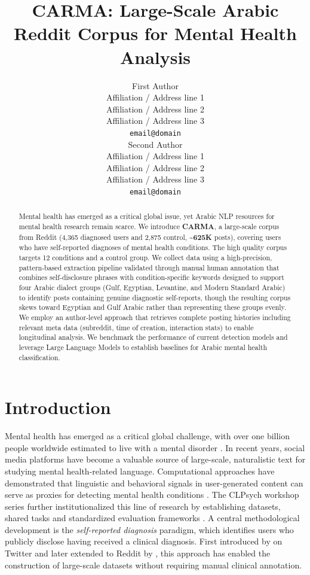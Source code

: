 \documentclass[11pt]{article}
\title{CARMA: Large-Scale Arabic Reddit Corpus for Mental Health Analysis}
\author{First Author \\
  Affiliation / Address line 1 \\
  Affiliation / Address line 2 \\
  Affiliation / Address line 3 \\
  \texttt{email@domain} \\\And
  Second Author \\
  Affiliation / Address line 1 \\
  Affiliation / Address line 2 \\
  Affiliation / Address line 3 \\
  \texttt{email@domain} \\}
\begin{document}
\maketitle
\begin{abstract}
Mental health has emerged as a critical global issue, yet Arabic NLP resources for mental health research remain scarce. We introduce \textbf{CARMA}, a large-scale corpus from Reddit (4,365 diagnosed users and 2,875 control, \textbf{\textasciitilde625K} posts), covering users who have self-reported diagnoses of mental health conditions. The high quality corpus targets 12 conditions and a control group. We collect data using a high-precision, pattern-based extraction pipeline validated
through manual human annotation that combines self-disclosure phrases with condition-specific keywords designed to support four
Arabic dialect groups (Gulf, Egyptian, Levantine, and Modern Standard Arabic) to identify posts containing genuine diagnostic self-reports, though the resulting corpus skews toward Egyptian and Gulf Arabic rather than representing these groups evenly. We employ an author-level approach that retrieves complete posting histories including relevant meta data (subreddit, time of creation, interaction stats) to enable longitudinal analysis. We benchmark the performance of current detection models and leverage Large Language Models to establish baselines for Arabic mental health classification. \end{abstract}



\section{Introduction}
\label{sec:introduction}
Mental health has emerged as a critical global challenge, with over one billion
people worldwide estimated to live with a mental disorder
\cite{who2025mental}. In recent years, social media platforms have become a valuable source of
large-scale, naturalistic text for studying mental health-related language.
Computational approaches have demonstrated that linguistic and behavioral signals
in user-generated content can serve as proxies for detecting mental health
conditions \cite{de2013predicting, chancellor2020methods}. The CLPsych workshop
series further institutionalized this line of research by establishing datasets, shared tasks and standardized evaluation frameworks \cite{coppersmith2015clpsych}.
A central methodological development is the \textit{self-reported diagnosis}
paradigm, which identifies users who publicly disclose having received a clinical
diagnosis. First introduced by \citet{coppersmith2014quantifying} on Twitter and
later extended to Reddit by \citet{cohan-etal-2018-smhd}, this approach has enabled the
construction of large-scale datasets without requiring manual clinical annotation.
\end{document}
